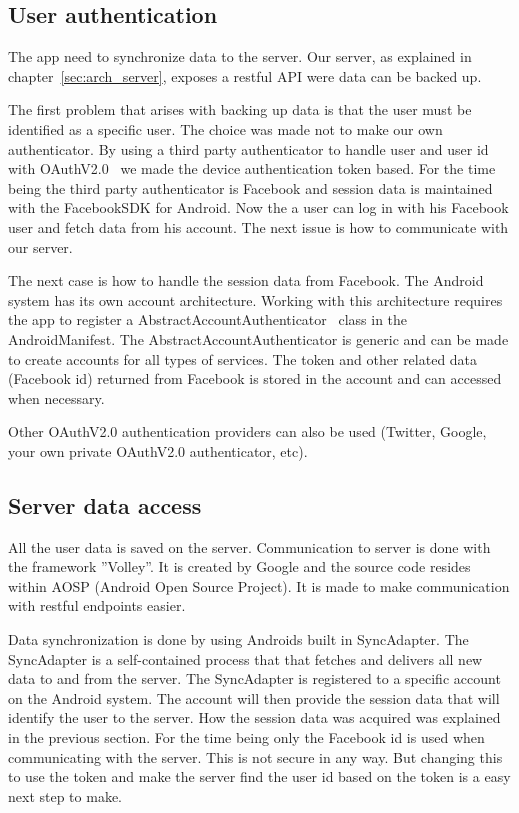 \subsection{User authentication}
The app need to synchronize data to the server. Our server, as explained in chapter~\ref{sec:arch_server}, exposes a restful API were data can be backed up.

The first problem that arises with backing up data is that the user must be identified as a specific user. The choice was made not to make our own authenticator. By using a third party authenticator to handle user and user id with OAuthV2.0~\cite{oauthv2.0} we made the device authentication token based.
For the time being the third party authenticator is Facebook and session data is maintained with the FacebookSDK for Android. 
Now the a user can log in with his Facebook user and fetch data from his account. The next issue is how to communicate with our server. 

The next case is how to handle the session data from Facebook. The Android system has its own account architecture. Working with this architecture requires the app to register a AbstractAccountAuthenticator~\cite{androidAccount} class in the AndroidManifest. The AbstractAccountAuthenticator is generic and can be made to create accounts for all types of services. The token and other related data (Facebook id) returned from Facebook is stored in the account and can accessed when necessary.

Other OAuthV2.0 authentication providers can also be used (Twitter, Google, your own private OAuthV2.0 authenticator, etc). 


\subsection{Server data access}

All the user data is saved on the server. Communication to server is done with the framework ''Volley''. It is created by Google and the source code resides within AOSP (Android Open Source Project). It is made to make communication with restful endpoints easier.

Data synchronization is done by using Androids built in SyncAdapter. The SyncAdapter is a self-contained process that that fetches and delivers all new data to and from the server. The SyncAdapter is registered to a specific account on the Android system. The account will then provide the session data that will identify the user to the server. How the session data was acquired was explained in the previous section. For the time being only the Facebook id is used when communicating with the server. This is not secure in any way. But changing this to use the token and make the server find the user id based on the token is a easy next step to make.

